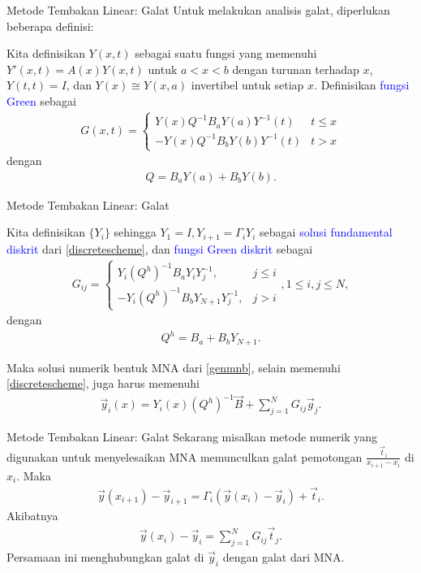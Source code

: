 \documentclass[xcolor={dvipsnames}, 9pt]{beamer}
\renewcommand{\emph}[1]{\textcolor{Blue}{#1}}
\begin{document}
	\begin{frame}{Metode Tembakan Linear: Galat}
		Untuk melakukan analisis galat, diperlukan beberapa definisi:
		\begin{definition}
			Kita definisikan $Y(x,t)$ sebagai suatu fungsi yang memenuhi $Y'(x,t) = A(x)Y(x,t)$ untuk $a<x<b$ dengan turunan terhadap $x$, $Y(t,t) = I$, dan $Y(x) \cong Y(x,a)$ invertibel untuk setiap $x$. Definisikan \emph{fungsi Green} sebagai
			\begin{align*}
				G(x,t) = \begin{cases}
					Y(x)Q^{-1}B_aY(a)Y^{-1}(t) & t\leq x \\
					-Y(x)Q^{-1}B_bY(b)Y^{-1}(t) & t > x
				\end{cases}
			\end{align*}
			dengan
			\begin{align*}
				Q = B_aY(a) + B_bY(b).
			\end{align*}
		\end{definition}
	\end{frame}
	\begin{frame}{Metode Tembakan Linear: Galat}
		\begin{definition}
			Kita definisikan $\{Y_i\}$ sehingga $Y_1 = I, Y_{i+1} = \Gamma_iY_i$ sebagai \emph{solusi fundamental diskrit} dari \eqref{discretescheme}, dan \emph{fungsi Green diskrit} sebagai
			\begin{align}\label{fgd}
				G_{ij} = \begin{cases}
					Y_i(Q^h)^{-1}B_aY_iY_j^{-1}, & j \leq i \\
					-Y_i(Q^h)^{-1}B_bY_{N+1}Y_j^{-1}, & j > i
				\end{cases},
				1 \leq i, j \leq N,
			\end{align}
			dengan
			\begin{align*}
				Q^h = B_a + B_bY_{N+1}.
			\end{align*}
		\end{definition}
		Maka solusi numerik bentuk MNA dari \eqref{genmnb}, selain memenuhi \eqref{discretescheme}, juga harus memenuhi
		\begin{align*}
			\vec{y}_i(x) = Y_i(x)(Q^h)^{-1}\vec{B} + \sum_{j=1}^{N} G_{ij}\vec{g}_j.
		\end{align*}
	\end{frame}
	\begin{frame}{Metode Tembakan Linear: Galat}
		Sekarang misalkan metode numerik yang digunakan untuk menyelesaikan MNA memunculkan galat pemotongan $\frac{\vec{t}_i}{x_{i+1}-x_i}$ di $x_i$. Maka
		\begin{align*}
			\vec{y}(x_{i+1}) - \vec{y}_{i+1} = \Gamma_i(\vec{y}(x_i)-\vec{y}_i) + \vec{t}_i.
		\end{align*}
		Akibatnya
		\begin{align*}
			\vec{y}(x_i) - \vec{y}_i = \sum_{j=1}^N G_{ij}\vec{t}_j.
		\end{align*}
		Persamaan ini menghubungkan galat di $\vec{y}_i$ dengan galat dari MNA.
	\end{frame}
\end{document}
